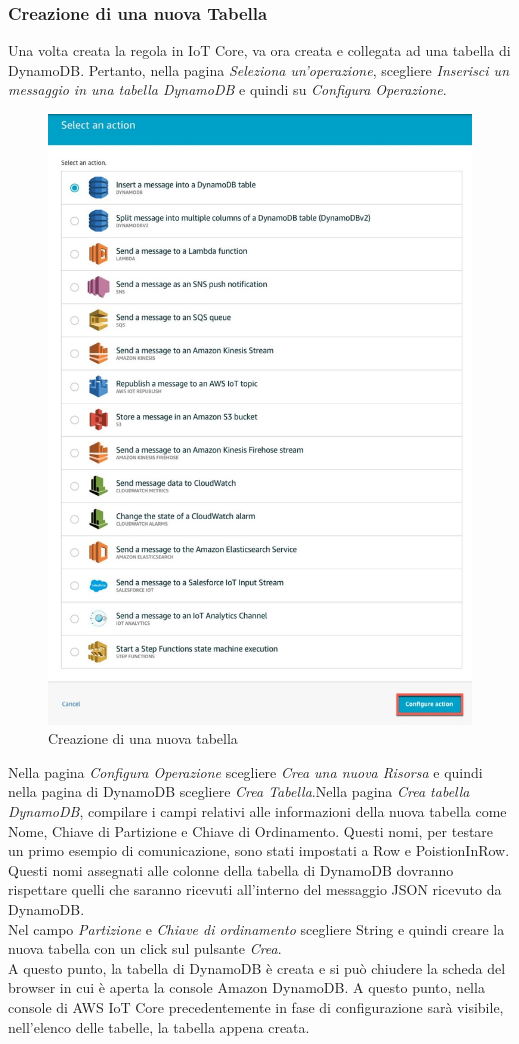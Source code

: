 \subsubsection{Creazione di una nuova Tabella}
Una volta creata la regola in IoT Core, va ora creata e collegata ad una tabella di DynamoDB. Pertanto, nella pagina \textit{Seleziona un'operazione}, scegliere \textit{Inserisci un messaggio in una tabella DynamoDB} e quindi su \textit{Configura Operazione}.
\begin{figure}
	\begin{center}
		\includegraphics[width=0.58\columnwidth]{images/dynamodb_4}
	\end{center}
	\caption{Creazione di una nuova tabella}
	\label{fig:dynamodb_4}
\end{figure}
Nella pagina \textit{Configura Operazione} scegliere \textit{Crea una nuova Risorsa} e quindi nella pagina di DynamoDB scegliere \textit{Crea Tabella}.Nella pagina \textit{Crea tabella DynamoDB}, compilare i campi relativi alle informazioni della nuova tabella come Nome, Chiave di Partizione e Chiave di Ordinamento. Questi nomi, per testare un primo esempio di comunicazione, sono stati impostati a Row e PoistionInRow. Questi nomi assegnati alle colonne della tabella di DynamoDB dovranno rispettare quelli che saranno ricevuti all'interno del messaggio JSON ricevuto da DynamoDB.\\
Nel campo \textit{Partizione} e \textit{Chiave di ordinamento} scegliere String e quindi creare la nuova tabella con un click sul pulsante \textit{Crea}.\\
A questo punto, la tabella di DynamoDB è creata e si può chiudere la scheda del browser in cui è aperta la console Amazon DynamoDB.
A questo punto, nella console di AWS IoT Core precedentemente in fase di configurazione sarà visibile, nell'elenco delle tabelle, la tabella appena creata.


